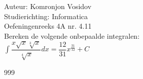 \documentclass[a4paper]{article}
\newcommand{\dint}{\displaystyle\int}
\begin{document}
	
	\noindent \large Auteur: Komronjon Vosidov \\
	\noindent \large Studierichting: Informatica\\
	\noindent \large Oefeningenreeks 4A nr. 4.11\\
	
	
	\medskip
	\normalsize
	Bereken de volgende onbepaalde integralen:\\
	
	$ \dint \dfrac{x \sqrt{x} \sqrt[3]{x}}{\sqrt[4]{x}} dx = \dfrac{12}{31}  x^{\tfrac{31}{12}} + C $
	
	
	
	
	
	
	
	\begin{thebibliography}{999}
	\end{thebibliography}		
\end{document}
